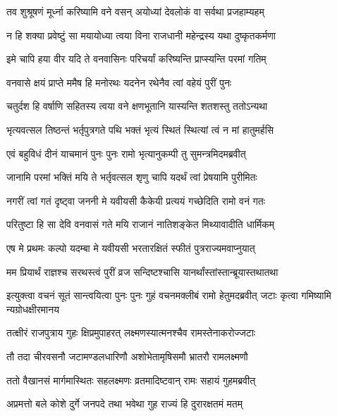 \twolineshloka
{तव शुश्रूषणं मूर्ध्ना करिष्यामि वने वसन्}
{अयोध्यां देवलोकं वा सर्वथा प्रजहाम्यहम्} %

\twolineshloka
{न हि शक्या प्रवेष्टुं सा मयायोध्या त्वया विना}
{राजधानी महेन्द्रस्य यथा दुष्कृतकर्मणा} %

\twolineshloka
{इमे चापि हया वीर यदि ते वनवासिनः}
{परिचर्यां करिष्यन्ति प्राप्स्यन्ति परमां गतिम्} %

\twolineshloka
{वनवासे क्षयं प्राप्ते ममैष हि मनोरथः}
{यदनेन रथेनैव त्वां वहेयं पुरीं पुनः} %

\twolineshloka
{चतुर्दश हि वर्षाणि सहितस्य त्वया वने}
{क्षणभूतानि यास्यन्ति शतशस्तु ततोऽन्यथा} %

\twolineshloka
{भृत्यवत्सल तिष्ठन्तं भर्तृपुत्रगते पथि}
{भक्तं भृत्यं स्थितं स्थित्यां त्वं न मां हातुमर्हसि} %

\twolineshloka
{एवं बहुविधं दीनं याचमानं पुनः पुनः}
{रामो भृत्यानुकम्पी तु सुमन्त्रमिदमब्रवीत्} %

\twolineshloka
{जानामि परमां भक्तिं मयि ते भर्तृवत्सल}
{शृणु चापि यदर्थं त्वां प्रेषयामि पुरीमितः} %

\twolineshloka
{नगरीं त्वां गतं दृष्ट्वा जननी मे यवीयसी}
{कैकेयी प्रत्ययं गच्छेदिति रामो वनं गतः} %

\twolineshloka
{परितुष्टा हि सा देवि वनवासं गते मयि}
{राजानं नातिशङ्केत मिथ्यावादीति धार्मिकम्} %

\twolineshloka
{एष मे प्रथमः कल्पो यदम्बा मे यवीयसी}
{भरतारक्षितं स्फीतं पुत्रराज्यमवाप्नुयात्} %

\twolineshloka
{मम प्रियार्थं राज्ञश्च सरथस्त्वं पुरीं व्रज}
{सन्दिष्टश्चासि यानर्थांस्तांस्तान्ब्रूयास्तथातथा} %

\threelineshloka
{इत्युक्त्वा वचनं सूतं सान्त्वयित्वा पुनः पुनः}
{गुहं वचनमक्लीबं रामो हेतुमदब्रवीत्}
{जटाः कृत्वा गमिष्यामि न्यग्रोधक्षीरमानय} %

\twolineshloka
{तत्क्षीरं राजपुत्राय गुहः क्षिप्रमुपाहरत्}
{लक्ष्मणस्यात्मनश्चैव रामस्तेनाकरोज्जटाः} %

\twolineshloka
{तौ तदा चीरवसनौ जटामण्डलधारिणौ}
{अशोभेतामृषिसमौ भ्रातरौ रामलक्ष्मणौ} %

\twolineshloka
{ततो वैखानसं मार्गमास्थितः सहलक्ष्मणः}
{व्रतमादिष्टवान् रामः सहायं गुहमब्रवीत्} %

\twolineshloka
{अप्रमत्तो बले कोशे दुर्गे जनपदे तथा}
{भवेथा गुह राज्यं हि दुरारक्षतमं मतम्} %

